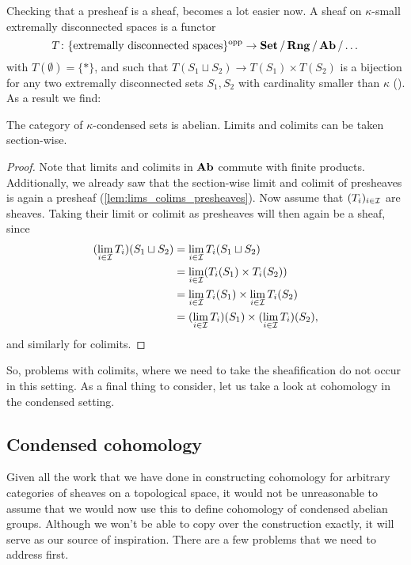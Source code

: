 \documentclass{article}
\DeclareMathOperator{\opp}{opp}
\begin{document}
Checking that a presheaf is a sheaf, becomes a lot easier now.
A sheaf on $\kappa$-small
extremally disconnected spaces is a functor
\begin{equation*}
    T \colon \{\text{extremally disconnected spaces}\}^{\opp} \to \Set / \Rng / \Ab/ \dots
\end{equation*}
with $T(\emptyset) = \{*\}$, and
such that $T(S_1 \sqcup S_2) \to T(S_1) \times T(S_2)$ is a bijection
for any two extremally disconnected sets $S_1, S_2$
with cardinality smaller than $\kappa$ (\cite[Theorem 1.2.18]{Dag2021FoundationsCM}).
As a result we find:
\begin{corollary}
    The category of $\kappa$-condensed sets is abelian. Limits
    and colimits can be taken section-wise.
\end{corollary}
\begin{proof}
    Note that limits and colimits in $\operatorname{\mathbf{Ab}}$ commute with finite products.
    Additionally, we already saw that the section-wise limit and colimit
    of presheaves is again a presheaf (\cref{lem:lims_colims_presheaves}).
    Now assume that $(T_i)_{i\in \mathcal{I}}$ are sheaves. Taking their
    limit or colimit as presheaves will then again be a sheaf,
    since
    \begin{align*}
        (\lim_{i\in \mathcal{I}}T_i)(S_1 \sqcup S_2)
         & = \lim_{i\in \mathcal{I}} T_i(S_1 \sqcup S_2)                            \\
         & = \lim_{i\in \mathcal{I}} (T_i(S_1) \times T_i(S_2))                     \\
         & = \lim_{i\in \mathcal{I}} T_i(S_1) \times \lim_{i\in \mathcal{I}} T_i(S_2)      \\
         & = (\lim_{i\in \mathcal{I}} T_i)(S_1) \times (\lim_{i\in \mathcal{I}} T_i)(S_2),
    \end{align*}
    and similarly for colimits.
\end{proof}

So, problems with colimits, where we need to take the sheafification
do not occur in this setting. As a final thing to consider, let
us take a look at cohomology in the condensed setting.

\subsection{Condensed cohomology}

Given all the work that we have done in constructing cohomology
for arbitrary categories of sheaves on a topological space,
it would not be unreasonable to assume that we would now use this
to define cohomology of condensed abelian groups.
Although we won't be able to copy over the construction exactly,
it will serve as our source of inspiration. There are a few
problems that we need to address first.
\end{document}
